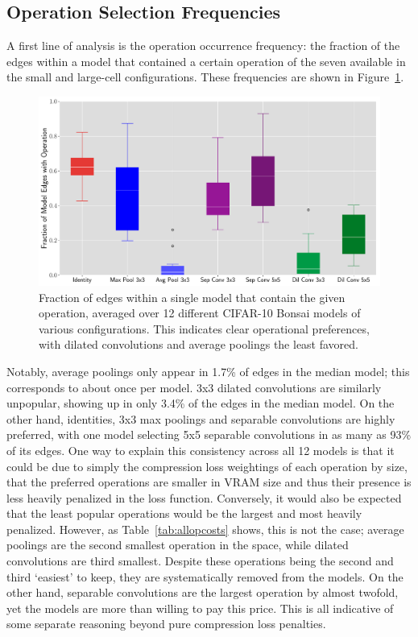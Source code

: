 \subsection{Operation Selection Frequencies}
A first line of analysis is the operation occurrence frequency: the fraction of the edges within a model that contained
a certain operation of the seven available in the small and large-cell configurations.
These frequencies are shown in Figure~\ref{fig:opfreq}.
\begin{figure}[ht]
	\centering
	\includegraphics[width=.9\textwidth]{op_frequency}
	\caption[Fraction of edges within a single model that contain a given operation]{Fraction of edges within a single model that contain the given operation, averaged over 12 different
	CIFAR-10 Bonsai models of various configurations. This indicates clear operational preferences, with dilated
	convolutions and average poolings the least favored. }
	\label{fig:opfreq}
\end{figure}

Notably, average poolings only appear in 1.7\% of edges in the median model;
this corresponds to about once per model. 3x3 dilated convolutions are similarly
unpopular, showing up in only 3.4\% of the edges in the median model. On the other hand, identities, 3x3 max
poolings and separable convolutions are highly preferred, with one model selecting 5x5 separable convolutions in as many as
93\% of its edges. One way to explain this consistency across all 12 models is that it could be due
to simply the compression loss weightings of each operation by size, that the preferred operations are smaller in VRAM
size and thus their presence is less heavily penalized in the loss function. Conversely, it would also be expected that the
least popular operations would be the largest and most heavily penalized. However, as Table~\ref{tab:allopcosts} shows,
this is not the case; average poolings are the second smallest operation in the space, while dilated convolutions
are third smallest. Despite these operations being the second and third `easiest' to keep, they are
systematically removed from the models. On the other hand, separable convolutions are the largest operation by almost
twofold, yet the models are more than willing to pay this price. This is all indicative of some separate reasoning beyond
pure compression loss penalties.


